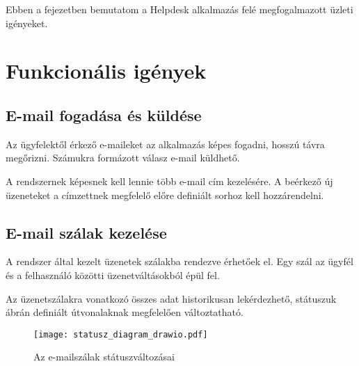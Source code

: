 Ebben a fejezetben bemutatom a \foreignlanguage{british}{Helpdesk} alkalmazás felé megfogalmazott üzleti igényeket.



\section{Funkcionális igények}

\subsection{E-mail fogadása és küldése}\label{sec:email_fogadas_kuldes}
Az ügyfelektől érkező e-maileket az alkalmazás képes fogadni, hosszú távra megőrizni. Számukra formázott válasz e-mail küldhető.

A rendszernek képesnek kell lennie több e-mail cím kezelésére. A beérkező új üzeneteket a címzettnek megfelelő előre definiált sorhoz kell hozzárendelni.



\subsection{E-mail szálak kezelése}
A rendszer által kezelt üzenetek szálakba rendezve érhetőek el. Egy szál az ügyfél és a felhasználó közötti üzenetváltásokból épül fel.

Az üzenetszálakra vonatkozó összes adat historikusan lekérdezhető, státuszuk  ábrán definiált útvonalaknak megfelelően változtatható.


\begin{figure}[hbt] 
	\centering
	\texttt{[image: statusz\_diagram\_drawio.pdf]}
	\caption{Az e-mailszálak státuszváltozásai}
	\label{fig:statusz_diagram}
\end{figure}



